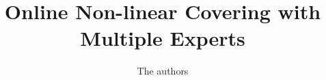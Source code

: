 \documentclass[11pt,a4paper]{article}
\begin{document}
\title{Online Non-linear Covering with Multiple Experts}

\author{The authors}

\maketitle








\clearpage




\clearpage

\appendix

\end{document}
